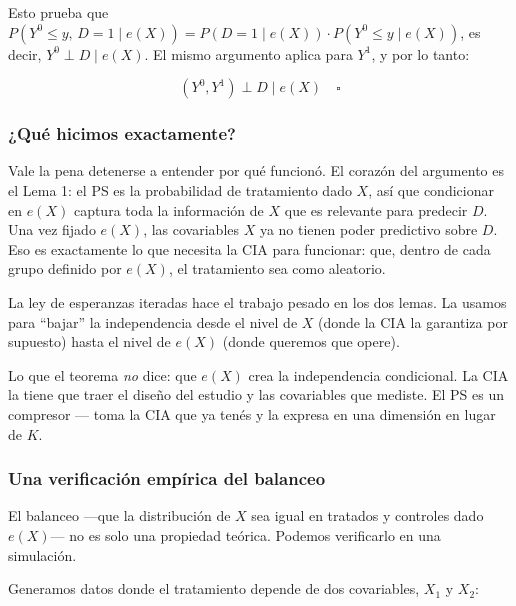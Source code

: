 \documentclass[
  letterpaper,
  DIV=11,
  numbers=noendperiod,
  oneside]{scrreprt}
\begin{document}
\begin{tcolorbox}
Esto prueba que
\(P(Y^0 \leq y,\, D = 1 \mid e(X)) = P(D = 1 \mid e(X)) \cdot P(Y^0 \leq y \mid e(X))\),
es decir, \(Y^0 \perp D \mid e(X)\). El mismo argumento aplica para
\(Y^1\), y por lo tanto:

\[(Y^0, Y^1) \perp D \mid e(X) \quad \square\]
\end{tcolorbox}

\hypertarget{quuxe9-hicimos-exactamente}{%
\subsubsection{¿Qué hicimos
exactamente?}\label{quuxe9-hicimos-exactamente}}

Vale la pena detenerse a entender por qué funcionó. El corazón del
argumento es el Lema 1: el PS es la probabilidad de tratamiento dado
\(X\), así que condicionar en \(e(X)\) captura toda la información de
\(X\) que es relevante para predecir \(D\). Una vez fijado \(e(X)\), las
covariables \(X\) ya no tienen poder predictivo sobre \(D\). Eso es
exactamente lo que necesita la CIA para funcionar: que, dentro de cada
grupo definido por \(e(X)\), el tratamiento sea como aleatorio.

La ley de esperanzas iteradas hace el trabajo pesado en los dos lemas.
La usamos para ``bajar'' la independencia desde el nivel de \(X\) (donde
la CIA la garantiza por supuesto) hasta el nivel de \(e(X)\) (donde
queremos que opere).

Lo que el teorema \emph{no} dice: que \(e(X)\) crea la independencia
condicional. La CIA la tiene que traer el diseño del estudio y las
covariables que mediste. El PS es un compresor --- toma la CIA que ya
tenés y la expresa en una dimensión en lugar de \(K\).

\hypertarget{una-verificaciuxf3n-empuxedrica-del-balanceo}{%
\subsubsection{Una verificación empírica del
balanceo}\label{una-verificaciuxf3n-empuxedrica-del-balanceo}}

El balanceo ---que la distribución de \(X\) sea igual en tratados y
controles dado \(e(X)\)--- no es solo una propiedad teórica. Podemos
verificarlo en una simulación.

Generamos datos donde el tratamiento depende de dos covariables, \(X_1\)
y \(X_2\):
\end{document}
